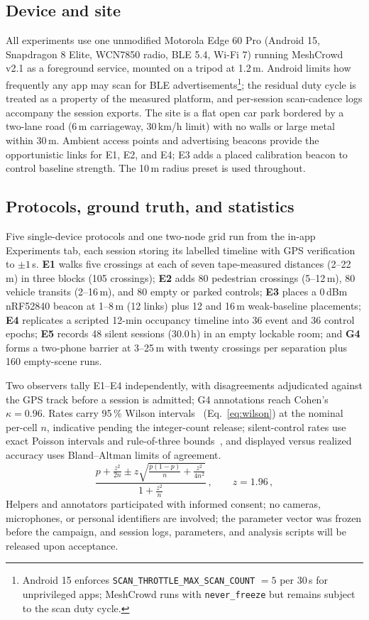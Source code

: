 \documentclass[conference,10pt]{IEEEtran}
\begin{document}
\subsection{Device and site}
All experiments use one unmodified Motorola Edge 60 Pro (Android 15,
Snapdragon 8 Elite, WCN7850 radio, BLE 5.4, Wi-Fi 7) running MeshCrowd
v2.1 as a foreground service, mounted on a tripod at 1.2\,m. Android limits how
frequently any app may scan for BLE advertisements\footnote{Android 15 enforces \texttt{SCAN\_THROTTLE\_MAX\_SCAN\_COUNT}
$=5$ per 30\,s for unprivileged apps; MeshCrowd runs with
\texttt{never\_freeze} but remains subject to the scan duty cycle.}; the
residual duty cycle is treated as a property of the measured platform, and
per-session scan-cadence logs accompany the session exports. The site is a
flat open car park bordered by a two-lane road (6\,m carriageway, 30\,km/h
limit) with no walls or large metal within 30\,m. Ambient access points and
advertising beacons provide the opportunistic links for E1, E2, and E4; E3
adds a placed calibration beacon to control baseline strength. The 10\,m
radius preset is used throughout.

\subsection{Protocols, ground truth, and statistics}
Five single-device protocols and one two-node grid run from the in-app
Experiments tab, each session storing its labelled timeline with GPS
verification to $\pm1$\,s. \textbf{E1} walks five crossings at each of seven
tape-measured distances (2--22\,m) in three blocks (105 crossings);
\textbf{E2} adds 80 pedestrian crossings (5--12\,m), 80 vehicle transits
(2--16\,m), and 80 empty or parked controls; \textbf{E3} places a 0\,dBm
nRF52840 beacon at 1--8\,m (12 links) plus 12 and 16\,m weak-baseline
placements; \textbf{E4} replicates a scripted 12-min occupancy timeline into
36 event and 36 control epochs; \textbf{E5} records 48 silent sessions
(30.0\,h) in an empty lockable room; and \textbf{G4} forms a two-phone
barrier at 3--25\,m with twenty crossings per separation plus 160 empty-scene
runs.

Two observers tally E1--E4 independently, with disagreements adjudicated
against the GPS track before a session is admitted; G4 annotations reach
Cohen's $\kappa=0.96$. Rates carry 95\,\% Wilson
intervals~\cite{Brown2001Wilson} (Eq.~\eqref{eq:wilson}) at the nominal per-cell $n$, indicative pending the
integer-count release; silent-control rates use exact Poisson intervals and
rule-of-three bounds~\cite{Hanley1983RuleOfThree}, and displayed versus realized accuracy uses
Bland--Altman limits of agreement.
\begin{equation}
\frac{p + \frac{z^2}{2n} \pm z\sqrt{\frac{p(1-p)}{n} + \frac{z^2}{4n^2}}}{1 + \frac{z^2}{n}}\,, \qquad z = 1.96\,,
\label{eq:wilson}
\end{equation}
Helpers and annotators participated with informed consent; no cameras,
microphones, or personal identifiers are involved; the parameter vector was
frozen before the campaign, and session logs, parameters, and analysis
scripts will be released upon acceptance.
\end{document}
